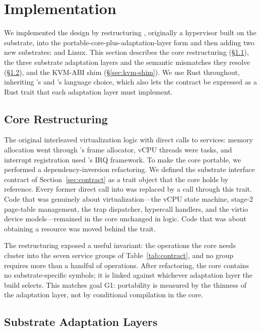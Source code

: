 \section{Implementation}

We implemented the design by restructuring \axvisor{}, originally a hypervisor
built on the \arceos{} substrate, into the portable-core-plus-adaptation-layer
form and then adding two new substrates: \asterinas{} and Linux. This section
describes the core restructuring (\S\ref{sec:core-restructuring}), the three
substrate adaptation layers and the semantic mismatches they resolve
(\S\ref{sec:adaptation-layers}), and the KVM-ABI shim
(\S\ref{sec:kvm-shim}). We use Rust throughout, inheriting \axvisor{}'s and
\arceos{}'s language choice, which also lets the contract be expressed as a Rust
trait that each adaptation layer must implement.

\subsection{Core Restructuring}
\label{sec:core-restructuring}

The original \axvisor{} interleaved virtualization logic with direct calls to
\arceos{} services: memory allocation went through \arceos{}'s frame allocator,
vCPU threads were \arceos{} tasks, and interrupt registration used \arceos{}'s
IRQ framework. To make the core portable, we performed a dependency-inversion
refactoring. We defined the substrate interface contract of
Section~\ref{sec:contract} as a trait object that the core holds by reference.
Every former direct call into \arceos{} was replaced by a call through this
trait. Code that was genuinely about virtualization---the vCPU state machine,
stage-2 page-table management, the trap dispatcher, hypercall handlers, and the
virtio device models---remained in the core unchanged in logic. Code that was
about obtaining a resource was moved behind the trait.

The restructuring exposed a useful invariant: the operations the core needs
cluster into the seven service groups of Table~\ref{tab:contract}, and no group
requires more than a handful of operations. After refactoring, the core contains
no substrate-specific symbols; it is linked against whichever adaptation layer
the build selects. This matches goal G1: portability is measured by the thinness
of the adaptation layer, not by conditional compilation in the core.

\subsection{Substrate Adaptation Layers}
\label{sec:adaptation-layers}

